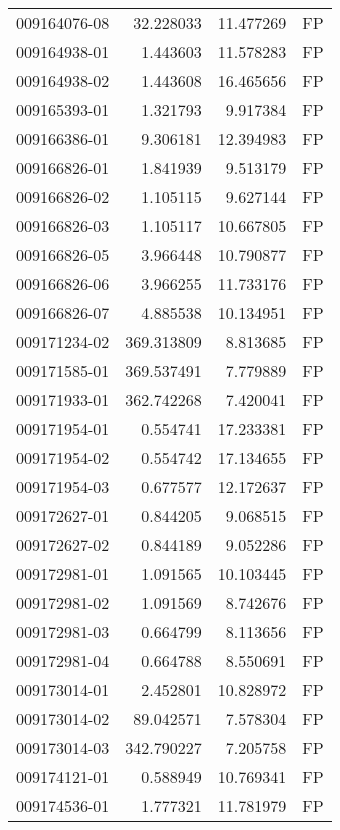 \begin{tabular}{lrrl}
009164076-08 &   32.228033 &      11.477269 &   FP \\
009164938-01 &    1.443603 &      11.578283 &   FP \\
009164938-02 &    1.443608 &      16.465656 &   FP \\
009165393-01 &    1.321793 &       9.917384 &   FP \\
009166386-01 &    9.306181 &      12.394983 &   FP \\
009166826-01 &    1.841939 &       9.513179 &   FP \\
009166826-02 &    1.105115 &       9.627144 &   FP \\
009166826-03 &    1.105117 &      10.667805 &   FP \\
009166826-05 &    3.966448 &      10.790877 &   FP \\
009166826-06 &    3.966255 &      11.733176 &   FP \\
009166826-07 &    4.885538 &      10.134951 &   FP \\
009171234-02 &  369.313809 &       8.813685 &   FP \\
009171585-01 &  369.537491 &       7.779889 &   FP \\
009171933-01 &  362.742268 &       7.420041 &   FP \\
009171954-01 &    0.554741 &      17.233381 &   FP \\
009171954-02 &    0.554742 &      17.134655 &   FP \\
009171954-03 &    0.677577 &      12.172637 &   FP \\
009172627-01 &    0.844205 &       9.068515 &   FP \\
009172627-02 &    0.844189 &       9.052286 &   FP \\
009172981-01 &    1.091565 &      10.103445 &   FP \\
009172981-02 &    1.091569 &       8.742676 &   FP \\
009172981-03 &    0.664799 &       8.113656 &   FP \\
009172981-04 &    0.664788 &       8.550691 &   FP \\
009173014-01 &    2.452801 &      10.828972 &   FP \\
009173014-02 &   89.042571 &       7.578304 &   FP \\
009173014-03 &  342.790227 &       7.205758 &   FP \\
009174121-01 &    0.588949 &      10.769341 &   FP \\
009174536-01 &    1.777321 &      11.781979 &   FP \\

\end{tabular}
